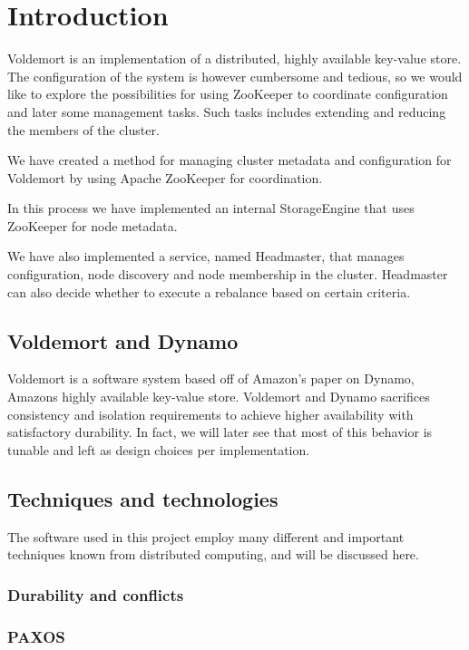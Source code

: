 
\section{Introduction}
Voldemort is an implementation of a distributed, highly available key-value store.
The configuration of the system is however cumbersome and tedious, so we would like to explore the possibilities for using ZooKeeper to coordinate configuration and later some management tasks.
Such tasks includes extending and reducing the members of the cluster.

We have created a method for managing cluster metadata and configuration for Voldemort by using Apache ZooKeeper for coordination.

In this process we have implemented an internal StorageEngine that uses ZooKeeper for node metadata.

We have also implemented a service, named Headmaster, that manages configuration, node discovery and node membership in the cluster.
Headmaster can also decide whether to execute a rebalance based on certain criteria.

\subsection{Voldemort and Dynamo}
Voldemort is a software system based off of Amazon's paper on Dynamo, Amazons highly available key-value store.
Voldemort and Dynamo sacrifices consistency and isolation requirements to achieve higher availability with satisfactory durability.
In fact, we will later see that most of this behavior is tunable and left as design choices per implementation.


\subsection{Techniques and technologies}
The software used in this project employ many different and important techniques known from distributed computing, and will be discussed here.


\subsubsection{Durability and conflicts}

\subsubsection{PAXOS}

